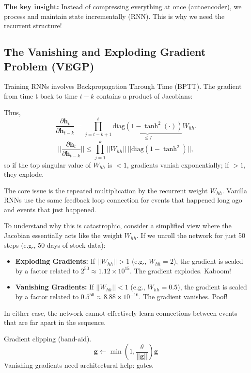 \documentclass{article}
\begin{document}
\textbf{The key insight:} Instead of compressing everything at once (autoencoder), we process and maintain state incrementally (RNN). This is why we need the recurrent structure!



\subsection{The Vanishing and Exploding Gradient Problem (VEGP)}

Training RNNs involves Backpropagation Through Time (BPTT). The gradient from time t back to time $t-k$ contains a product of Jacobians:

Thus,
\[
\frac{\partial \mathbf{h}_{t}}{\partial \mathbf{h}_{t-k}}=\prod_{j=t-k+1}^{t}\underbrace{\text{diag}(1-\tanh^{2}(\cdot))}_{\le I}W_{hh}.
\]
\[
||\frac{\partial \mathbf{h}_{t}}{\partial \mathbf{h}_{t-k}}||\le\prod_{j=1}^{k}||W_{hh}||\,||\text{diag}(1-\tanh^{2})||,
\]
so if the top singular value of $W_{hh}$ is $<1$, gradients vanish exponentially; if $>1$, they explode.

\begin{tcolorbox}[colback=red!5!white,colframe=red!60!black,title=The Severity of VEGP: A Numerical Intuition]
The core issue is the repeated multiplication by the recurrent weight $W_{hh}$. Vanilla RNNs use the same feedback loop connection for events that happened long ago and events that just happened.

To understand why this is catastrophic, consider a simplified view where the Jacobian essentially acts like the weight $W_{hh}$. If we unroll the network for just 50 steps (e.g., 50 days of stock data):
\begin{itemize}
    \item \textbf{Exploding Gradients:} If $||W_{hh}|| > 1$ (e.g., $W_{hh}=2$), the gradient is scaled by a factor related to $2^{50} \approx 1.12 \times 10^{15}$. The gradient explodes. Kaboom!
    \item \textbf{Vanishing Gradients:} If $||W_{hh}|| < 1$ (e.g., $W_{hh}=0.5$), the gradient is scaled by a factor related to $0.5^{50} \approx 8.88 \times 10^{-16}$. The gradient vanishes. Poof!
\end{itemize}
In either case, the network cannot effectively learn connections between events that are far apart in the sequence.
\end{tcolorbox}

Gradient clipping (band-aid).
\[
\mathbf{g}\leftarrow\min\left(1,\frac{\theta}{||\mathbf{g}||}\right)\mathbf{g}
\]
Vanishing gradients need architectural help: gates.
\end{document}
